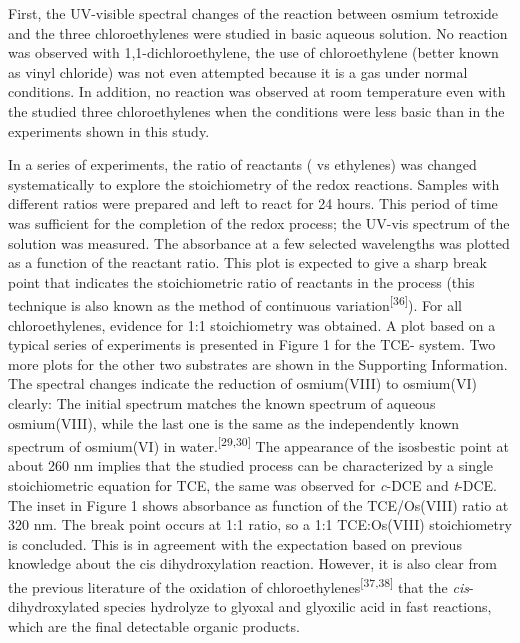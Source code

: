 \documentclass{article}
\begin{document}
First, the UV-visible spectral changes of the reaction between osmium tetroxide and the three chloroethylenes were studied in basic aqueous solution. No reaction was observed with 1,1-dichloroethylene, the use of chloroethylene (better known as vinyl chloride) was not even attempted because it is a gas under normal conditions. In addition, no reaction was observed at room temperature even with the studied three chloroethylenes when the conditions were less basic than in the experiments shown in this study.

In a series of experiments, the ratio of reactants ( vs ethylenes) was changed systematically to explore the stoichiometry of the redox reactions. Samples with different ratios were prepared and left to react for 24 hours. This period of time was sufficient for the completion of the redox process; the UV-vis spectrum of the solution was measured. The absorbance at a few selected wavelengths was plotted as a function of the reactant ratio. This plot is expected to give a sharp break point that indicates the stoichiometric ratio of reactants in the process (this technique is also known as the method of continuous variation\textsuperscript{[36]}). For all chloroethylenes, evidence for 1:1 stoichiometry was obtained. A plot based on a typical series of experiments is presented in Figure 1 for the TCE- system. Two more plots for the other two substrates are shown in the Supporting Information. The spectral changes indicate the reduction of osmium(VIII) to osmium(VI) clearly: The initial spectrum matches the known spectrum of aqueous osmium(VIII), while the last one is the same as the independently known spectrum of osmium(VI) in water.\textsuperscript{[29,30]} The appearance of the isosbestic point at about 260 nm implies that the studied process can be characterized by a single stoichiometric equation for TCE, the same was observed for \emph{c}-DCE and \emph{t}-DCE. The inset in Figure 1 shows absorbance as function of the TCE/Os(VIII) ratio at 320 nm. The break point occurs at 1:1 ratio, so a 1:1 TCE:Os(VIII) stoichiometry is concluded. This is in agreement with the expectation based on previous knowledge about the cis dihydroxylation reaction. However, it is also clear from the previous literature of the oxidation of chloroethylenes\textsuperscript{[37,38]} that the \emph{cis}-dihydroxylated species hydrolyze to glyoxal and glyoxilic acid in fast reactions, which are the final detectable organic products.
\end{document}
